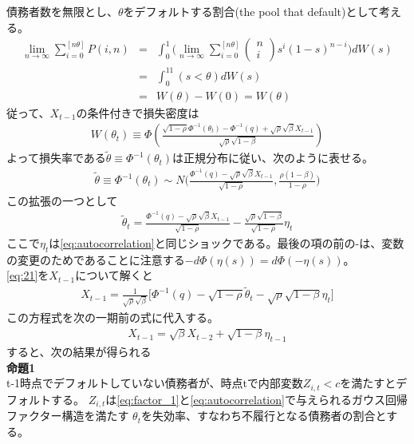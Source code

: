 \documentclass[a4j,12pt]{jarticle}
\begin{document}
債務者数を無限とし、$\theta$をデフォルトする割合(the pool that default)として考える。
\begin{eqnarray}
\lim_{n\rightarrow\infty}\sum_{i=0}^{[n\theta]}P(i,n)
&=&
\int_0^1\bigl(\lim_{n\rightarrow\infty}\sum_{i=0}^{[n\theta]}
\begin{pmatrix}
n\\
i
\end{pmatrix}
s^i(1-s)^{n-i}
\bigr)dW(s)\\
&=&
\int_0^11(s<\theta)dW(s)\\
&=&
W(\theta)-W(0)=W(\theta)
\end{eqnarray}
従って、$X_{t-1}$の条件付きで損失密度は
\begin{eqnarray}
W(\theta_t)\equiv\Phi(\frac{\sqrt{1-\rho}\Phi^{-1}(\theta_t)-\Phi^{-1}(q)+\sqrt{\rho}\sqrt{\beta}X_{t-1}}{\sqrt{\rho}\sqrt{1-\beta}})
\end{eqnarray}
よって損失率である$\tilde{\theta}\equiv\Phi^{-1}(\theta_t)$は正規分布に従い、次のように表せる。
\begin{eqnarray}
\tilde{\theta}\equiv\Phi^{-1}(\theta_t)\sim N\bigl(\frac{\Phi^{-1}(q)-\sqrt{\rho}\sqrt{\beta}X_{t-1}}{\sqrt{1-\rho}},
\frac{\rho(1-\beta)}{1-\rho}
\bigr)
\end{eqnarray}
この拡張の一つとして
\begin{eqnarray}
\tilde{\theta}_t=\frac{\Phi^{-1}(q)-\sqrt{\rho}\sqrt{\beta}X_{t-1}}{\sqrt{1-\rho}}-
\frac{\sqrt{\rho}\sqrt{1-\beta}}{\sqrt{1-\rho}}\eta_t
\label{eq:21}
\end{eqnarray}
ここで$\eta_t$は\eqref{eq:autocorrelation}と同じショックである。最後の項の前の-は、変数の変更のためであることに注意する$-d\Phi(\eta(s))=d\Phi(-\eta(s))$。\\
\eqref{eq:21}を$X_{t-1}$について解くと
\begin{eqnarray}
X_{t-1}=\frac{1}{\sqrt{\rho}\sqrt{\beta}}\bigl[\Phi^{-1}(q)-\sqrt{1-\rho}\tilde{\theta}_t-\sqrt{\rho}\sqrt{1-\beta}\eta_t\bigr]
\end{eqnarray}
この方程式を次の一期前の式に代入する。
\begin{eqnarray}
X_{t-1}=\sqrt{\beta}X_{t-2}+\sqrt{1-\beta}\eta_{t-1}
\end{eqnarray}
すると、次の結果が得られる\\
{\bf 命題1}\\
\indent t-1時点でデフォルトしていない債務者が、時点tで内部変数$Z_{i,t}<c$を満たすとデフォルトする。
$Z_{i,t}$は\eqref{eq:factor_1}と\eqref{eq:autocorrelation}で与えられるガウス回帰ファクター構造を満たす
$\theta_t$を失効率、すなわち不履行となる債務者の割合とする。
\end{document}
